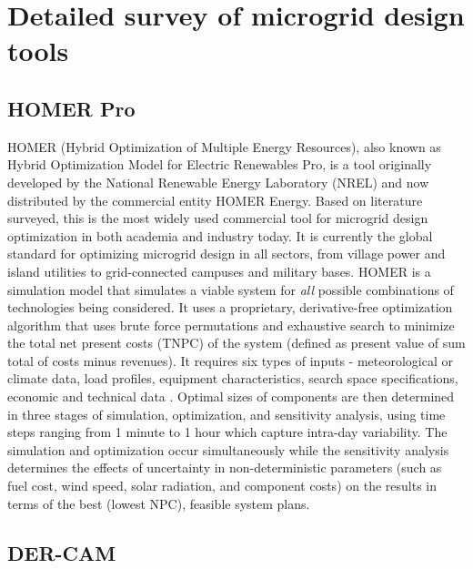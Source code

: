 \documentclass[final,3p,times]{elsarticle}
\begin{document}

\section{Detailed survey of microgrid design tools \label{app:tools}}

\subsection{HOMER Pro}

HOMER (Hybrid Optimization of Multiple Energy Resources), also known as Hybrid Optimization Model for Electric Renewables Pro, is a tool originally developed by the National Renewable Energy Laboratory (NREL) and now distributed by the commercial entity HOMER Energy. Based on literature surveyed, this is the most widely used commercial tool for microgrid design optimization in both academia and industry today. It is currently the global standard for optimizing microgrid design in all sectors, from village power and island utilities to grid-connected campuses and military bases. HOMER is a simulation model that simulates a viable system for \textit{all} possible combinations of technologies being considered. It uses a proprietary, derivative-free optimization algorithm that uses brute force permutations and exhaustive search \cite{weng2016} to minimize the total net present costs (TNPC) of the system (defined as present value of sum total of costs minus revenues). It requires six types of inputs - meteorological or climate data, load profiles, equipment characteristics, search space specifications, economic and technical data \cite{bahramara2016}. Optimal sizes of components are then determined in three stages of simulation, optimization, and sensitivity analysis, using time steps ranging from 1 minute to 1 hour which capture intra-day variability. The simulation and optimization occur simultaneously while the sensitivity analysis determines the effects of uncertainty in non-deterministic parameters (such as fuel cost, wind speed, solar radiation, and component costs) on the results in terms of the best (lowest NPC), feasible system plans.

\subsection{DER-CAM}
\end{document}
